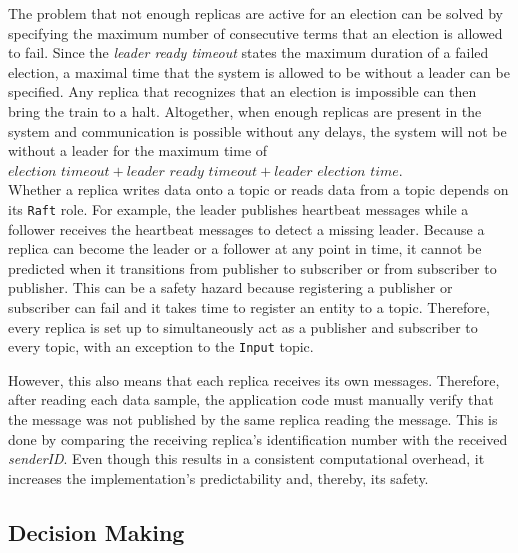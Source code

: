 The problem that not enough replicas are active for an election can be solved by specifying the maximum number of consecutive terms that an election is allowed to fail.
Since the \textit{leader ready timeout} states the maximum duration of a failed election, a maximal time that the system is allowed to be without a leader can be specified.
Any replica that recognizes that an election is impossible can then bring the train to a halt.
Altogether, when enough replicas are present in the system and communication is possible without any delays, the system will not be without a leader for the maximum time of $\textit{election timeout} + \textit{leader ready timeout} + \textit{leader election time}$.
\\

Whether a replica writes data onto a topic or reads data from a topic depends on its \texttt{Raft} role.
For example, the leader publishes heartbeat messages while a follower receives the heartbeat messages to detect a missing leader.
Because a replica can become the leader or a follower at any point in time, it cannot be predicted when it transitions from publisher to subscriber or from subscriber to publisher.
This can be a safety hazard because registering a publisher or subscriber can fail and it takes time to register an  entity to a topic.
Therefore, every replica is set up to simultaneously act as a publisher and subscriber to every topic, with an exception to the \texttt{Input} topic.

However, this also means that each replica receives its own messages.
Therefore, after reading each data sample, the application code must manually verify that the message was not published by the same replica reading the message.
This is done by comparing the receiving replica's identification number with the received \textit{senderID}.
Even though this results in a consistent computational overhead, it increases the implementation's predictability and, thereby, its safety.

\subsection{Decision Making}
\label{subsec:ImpInputProcessing}


